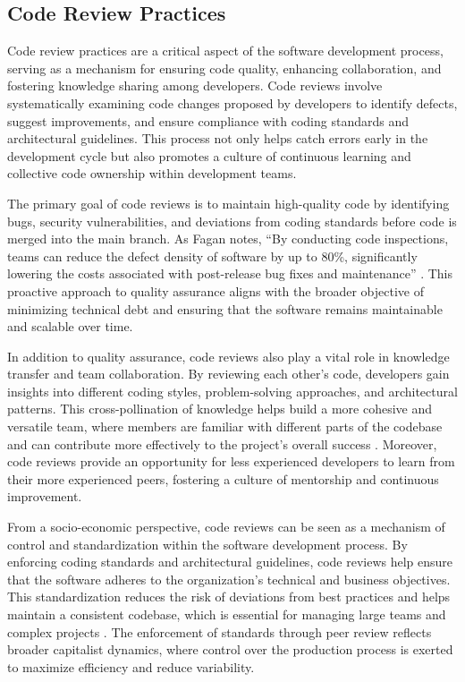 \begin{refsection}
\subsection{Code Review Practices}

Code review practices are a critical aspect of the software development process, serving as a mechanism for ensuring code quality, enhancing collaboration, and fostering knowledge sharing among developers. Code reviews involve systematically examining code changes proposed by developers to identify defects, suggest improvements, and ensure compliance with coding standards and architectural guidelines. This process not only helps catch errors early in the development cycle but also promotes a culture of continuous learning and collective code ownership within development teams.

The primary goal of code reviews is to maintain high-quality code by identifying bugs, security vulnerabilities, and deviations from coding standards before code is merged into the main branch. As Fagan notes, “By conducting code inspections, teams can reduce the defect density of software by up to 80\%, significantly lowering the costs associated with post-release bug fixes and maintenance” \cite[pp.~50-52]{Fagan1976}. This proactive approach to quality assurance aligns with the broader objective of minimizing technical debt and ensuring that the software remains maintainable and scalable over time.

In addition to quality assurance, code reviews also play a vital role in knowledge transfer and team collaboration. By reviewing each other’s code, developers gain insights into different coding styles, problem-solving approaches, and architectural patterns. This cross-pollination of knowledge helps build a more cohesive and versatile team, where members are familiar with different parts of the codebase and can contribute more effectively to the project’s overall success \cite[pp.~145-148]{Bacchelli2013}. Moreover, code reviews provide an opportunity for less experienced developers to learn from their more experienced peers, fostering a culture of mentorship and continuous improvement.

From a socio-economic perspective, code reviews can be seen as a mechanism of control and standardization within the software development process. By enforcing coding standards and architectural guidelines, code reviews help ensure that the software adheres to the organization’s technical and business objectives. This standardization reduces the risk of deviations from best practices and helps maintain a consistent codebase, which is essential for managing large teams and complex projects \cite[pp.~112-115]{Pressman2019}. The enforcement of standards through peer review reflects broader capitalist dynamics, where control over the production process is exerted to maximize efficiency and reduce variability.


\end{refsection}

